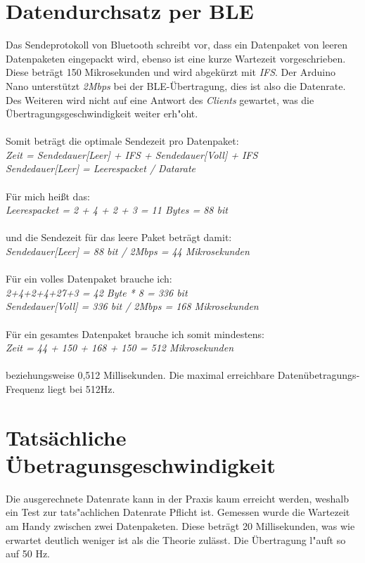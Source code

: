 \section{Datendurchsatz per BLE}

Das Sendeprotokoll von Bluetooth schreibt vor, dass ein Datenpaket von
leeren Datenpaketen eingepackt wird, ebenso ist eine kurze Wartezeit vorgeschrieben. 
Diese beträgt 150 Mikrosekunden und wird abgekürzt mit \textit{IFS}.
Der Arduino Nano unterstützt \textit{2Mbps} bei der BLE-Übertragung, dies ist also die Datenrate.
Des Weiteren wird nicht auf eine Antwort des \textit{Clients} gewartet, was die 
Übertragungsgeschwindigkeit weiter erh"oht.\\
\\
Somit beträgt die optimale Sendezeit pro Datenpaket:\\
\textit{Zeit = Sendedauer[Leer] + IFS + Sendedauer[Voll] + IFS\\
Sendedauer[Leer] = Leerespacket / Datarate}\\
\\
Für mich heißt das:\\
\textit{Leerespacket = 2 + 4 + 2 + 3 = 11 Bytes = 88 bit}\\
\\
und die Sendezeit für das leere Paket beträgt damit:\\
\textit{Sendedauer[Leer] = 88 bit / 2Mbps = 44 Mikrosekunden}\\
\\
Für ein volles Datenpaket brauche ich:\\
\textit{2+4+2+4+27+3 = 42 Byte * 8 = 336 bit\\
Sendedauer[Voll] = 336 bit / 2Mbps = 168 Mikrosekunden}\\
\\
Für ein gesamtes Datenpaket brauche ich somit mindestens:\\
\textit{Zeit = 44 + 150 + 168 + 150 = 512 Mikrosekunden}\\
\\
beziehungsweise 0,512 Millisekunden. Die maximal erreichbare Datenübetragungs-Frequenz
liegt bei 512Hz.


\section{Tatsächliche Übetragunsgeschwindigkeit}
Die ausgerechnete Datenrate kann in der Praxis kaum erreicht werden, weshalb ein Test zur 
tats"achlichen Datenrate Pflicht ist. Gemessen wurde die Wartezeit am Handy zwischen zwei
Datenpaketen. Diese beträgt 20 Millisekunden, was wie erwartet deutlich weniger ist als die
Theorie zulässt. Die Übertragung l"auft so auf 50 Hz.

